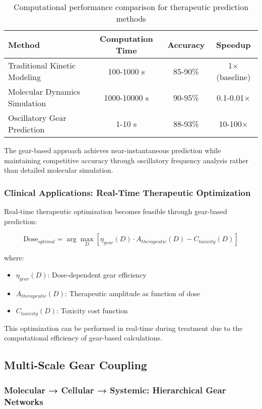 \documentclass[12pt,a4paper]{article}
\begin{document}
\begin{table}[H]
\centering
\begin{tabular}{|l|c|c|c|}
\hline
\textbf{Method} & \textbf{Computation Time} & \textbf{Accuracy} & \textbf{Speedup} \\
\hline
Traditional Kinetic Modeling & 100-1000 s & 85-90\% & 1$\times$ (baseline) \\
Molecular Dynamics Simulation & 1000-10000 s & 90-95\% & 0.1-0.01$\times$ \\
Oscillatory Gear Prediction & 1-10 s & 88-93\% & 10-100$\times$ \\
\hline
\end{tabular}
\caption{Computational performance comparison for therapeutic prediction methods}
\end{table}

The gear-based approach achieves near-instantaneous prediction while maintaining competitive accuracy through oscillatory frequency analysis rather than detailed molecular simulation.

\subsubsection{Clinical Applications: Real-Time Therapeutic Optimization}

Real-time therapeutic optimization becomes feasible through gear-based prediction:

\begin{equation}
\text{Dose}_{optimal} = \arg\max_{D} \left[\eta_{gear}(D) \cdot A_{therapeutic}(D) - C_{toxicity}(D)\right]
\end{equation}

where:
\begin{itemize}
\item $\eta_{gear}(D)$: Dose-dependent gear efficiency
\item $A_{therapeutic}(D)$: Therapeutic amplitude as function of dose
\item $C_{toxicity}(D)$: Toxicity cost function
\end{itemize}

This optimization can be performed in real-time during treatment due to the computational efficiency of gear-based calculations.

\subsection{Multi-Scale Gear Coupling}

\subsubsection{Molecular → Cellular → Systemic: Hierarchical Gear Networks}
\end{document}
